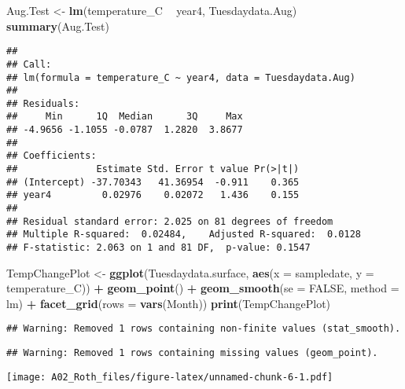 \documentclass[]{article}
\newenvironment{Shaded}{\begin{snugshade}}{\end{snugshade}}
\newcommand{\DataTypeTok}[1]{\textcolor[rgb]{0.13,0.29,0.53}{#1}}
\newcommand{\KeywordTok}[1]{\textcolor[rgb]{0.13,0.29,0.53}{\textbf{#1}}}
\newcommand{\NormalTok}[1]{#1}
\newcommand{\OperatorTok}[1]{\textcolor[rgb]{0.81,0.36,0.00}{\textbf{#1}}}
\newcommand{\OtherTok}[1]{\textcolor[rgb]{0.56,0.35,0.01}{#1}}
\newcommand{\StringTok}[1]{\textcolor[rgb]{0.31,0.60,0.02}{#1}}
\begin{document}
\begin{Shaded}
\begin{Highlighting}[]
\NormalTok{Aug.Test <-}\StringTok{ }\KeywordTok{lm}\NormalTok{(temperature_C }\OperatorTok{~}\StringTok{ }\NormalTok{year4, Tuesdaydata.Aug)}
\KeywordTok{summary}\NormalTok{(Aug.Test)}
\end{Highlighting}
\end{Shaded}

\begin{verbatim}
## 
## Call:
## lm(formula = temperature_C ~ year4, data = Tuesdaydata.Aug)
## 
## Residuals:
##     Min      1Q  Median      3Q     Max 
## -4.9656 -1.1055 -0.0787  1.2820  3.8677 
## 
## Coefficients:
##              Estimate Std. Error t value Pr(>|t|)
## (Intercept) -37.70343   41.36954  -0.911    0.365
## year4         0.02976    0.02072   1.436    0.155
## 
## Residual standard error: 2.025 on 81 degrees of freedom
## Multiple R-squared:  0.02484,    Adjusted R-squared:  0.0128 
## F-statistic: 2.063 on 1 and 81 DF,  p-value: 0.1547
\end{verbatim}

\begin{Shaded}
\begin{Highlighting}[]
\NormalTok{TempChangePlot <-}\StringTok{ }
\StringTok{  }\KeywordTok{ggplot}\NormalTok{(Tuesdaydata.surface, }\KeywordTok{aes}\NormalTok{(}\DataTypeTok{x =}\NormalTok{ sampledate, }\DataTypeTok{y =}\NormalTok{ temperature_C)) }\OperatorTok{+}
\StringTok{  }\KeywordTok{geom_point}\NormalTok{() }\OperatorTok{+}
\StringTok{  }\KeywordTok{geom_smooth}\NormalTok{(}\DataTypeTok{se =} \OtherTok{FALSE}\NormalTok{, }\DataTypeTok{method =}\NormalTok{ lm) }\OperatorTok{+}
\StringTok{  }\KeywordTok{facet_grid}\NormalTok{(}\DataTypeTok{rows =} \KeywordTok{vars}\NormalTok{(Month))}
\KeywordTok{print}\NormalTok{(TempChangePlot)}
\end{Highlighting}
\end{Shaded}

\begin{verbatim}
## Warning: Removed 1 rows containing non-finite values (stat_smooth).
\end{verbatim}

\begin{verbatim}
## Warning: Removed 1 rows containing missing values (geom_point).
\end{verbatim}

\texttt{[image: A02\_Roth\_files/figure-latex/unnamed-chunk-6-1.pdf]}
\end{document}

